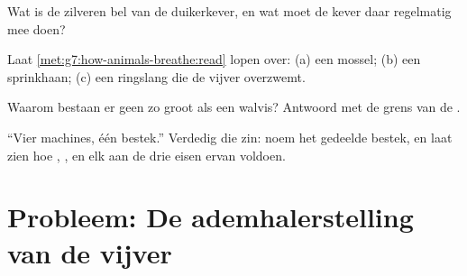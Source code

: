 \begin{exercise}[$\star\star$]\label{exo:g7:how-animals-breathe:9}
Wat is de zilveren bel van de duikerkever, en wat moet de kever daar
regelmatig mee doen?
\end{exercise}

\begin{exercise}[$\star\star$]\label{exo:g7:how-animals-breathe:10}
Laat \cref{met:g7:how-animals-breathe:read} lopen over: (a) een mossel;
(b) een sprinkhaan; (c) een ringslang die de vijver overzwemt.
\end{exercise}

\begin{exercise}[$\star\star$]\label{exo:g7:how-animals-breathe:11}
Waarom bestaan er geen  zo groot als een walvis? Antwoord met de
grens van de .
\end{exercise}

\begin{exercise}[$\star\star\star$]\label{exo:g7:how-animals-breathe:12}
``Vier machines, één bestek.'' Verdedig die zin: noem het gedeelde bestek,
en laat zien hoe , ,  en  elk aan de drie eisen
ervan voldoen.
\end{exercise}

\section{Probleem: De ademhalerstelling van de vijver}

